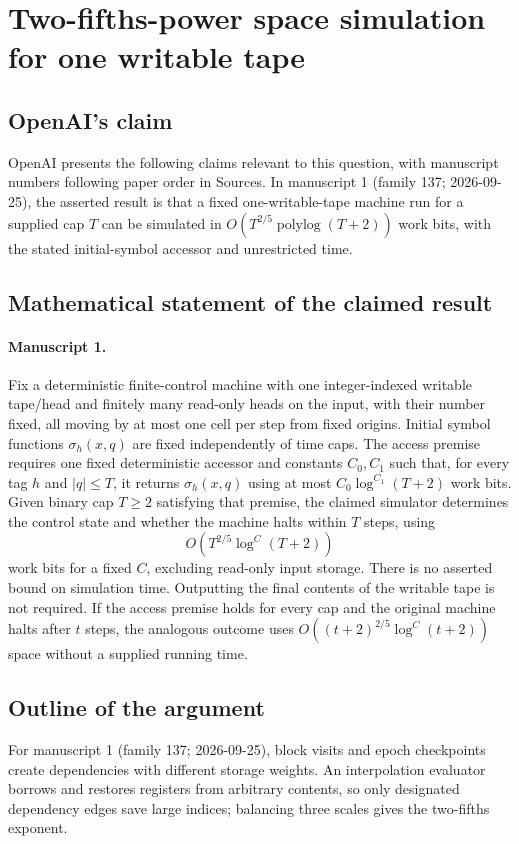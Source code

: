 \documentclass[11pt]{article}
\begin{document}
\section*{Two-fifths-power space simulation for one writable tape}

\subsection{OpenAI's claim}
OpenAI presents the following claims relevant to this question, with manuscript numbers following paper order in Sources. In manuscript 1 (family 137; 2026-09-25), the asserted result is that a fixed one-writable-tape machine run for a supplied cap $T$ can be simulated in $O(T^{2/5}\operatorname{polylog}(T+2))$ work bits, with the stated initial-symbol accessor and unrestricted time.

\subsection{Mathematical statement of the claimed result}
\paragraph{Manuscript 1.}
Fix a deterministic finite-control machine with one integer-indexed writable tape/head and finitely many read-only heads on the input, with their number fixed, all moving by at most one cell per step from fixed origins. Initial symbol functions $\sigma_h(x,q)$ are fixed independently of time caps. The access premise requires one fixed deterministic accessor and constants $C_0,C_1$ such that, for every tag $h$ and $|q|\le T$, it returns $\sigma_h(x,q)$ using at most $C_0\log^{C_1}(T+2)$ work bits. Given binary cap $T\ge2$ satisfying that premise, the claimed simulator determines the control state and whether the machine halts within $T$ steps, using
\[
 O(T^{2/5}\log^C(T+2))
\]
work bits for a fixed $C$, excluding read-only input storage. There is no asserted bound on simulation time. Outputting the final contents of the writable tape is not required. If the access premise holds for every cap and the original machine halts after $t$ steps, the analogous outcome uses $O((t+2)^{2/5}\log^C(t+2))$ space without a supplied running time.

\subsection{Outline of the argument}
For manuscript 1 (family 137; 2026-09-25), block visits and epoch checkpoints create dependencies with different storage weights. An interpolation evaluator borrows and restores registers from arbitrary contents, so only designated dependency edges save large indices; balancing three scales gives the two-fifths exponent.
\end{document}
